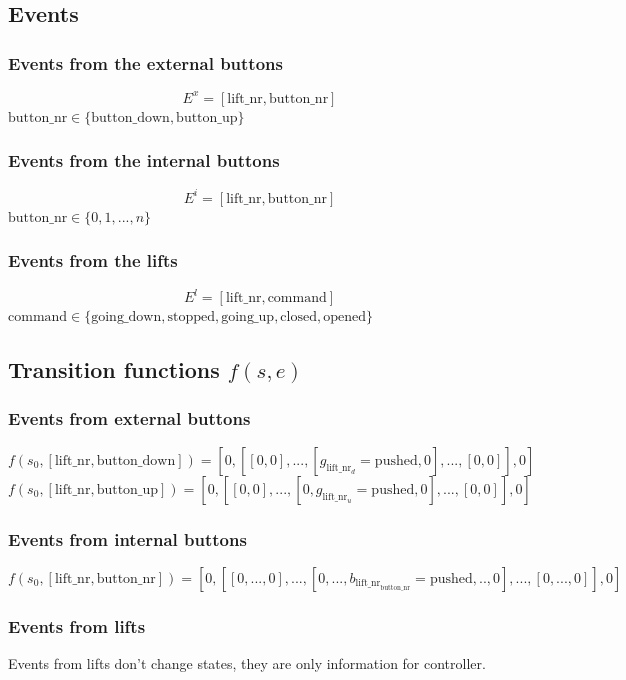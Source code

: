 \documentclass[12pt]{article}
\begin{document}
\subsection{Events}


\subsubsection{Events from the external buttons} 
\[ E^x = [\text{lift\_nr},\text{button\_nr}] \]
\(\text{button\_nr} \in \{\text{button\_down},\text{button\_up}\}\)

\subsubsection{Events from the internal buttons}
\[ E^i = [\text{lift\_nr},\text{button\_nr}] \]
\(\text{button\_nr} \in \{0, 1,..., n\}\)

\subsubsection{Events from the lifts}
\[ E^l = [\text{lift\_nr}, \text{command}] \]
\(\text{command} \in \{\text{going\_down},\text{stopped},\text{going\_up},\text{closed},\text{opened}\}\)

\subsection{Transition functions \(f(s,e)\)}

\subsubsection{Events from external buttons}
\[
  f(s_0,[\text{lift\_nr},\text{button\_down}]) =
  [0,[[0,0],...,[g_{\text{lift\_nr}_d}=\text{pushed},0],...,[0,0]],0]
\]
\[
  f(s_0,[\text{lift\_nr},\text{button\_up}]) =
  [0,[[0,0],...,[0,g_{\text{lift\_nr}_u}=\text{pushed},0],...,[0,0]],0]
\]


\subsubsection{Events from internal buttons}
\[
  f(s_0,[\text{lift\_nr},\text{button\_nr}]) =
  [0,[[0,...,0],...,[0,...,b_{\text{lift\_nr}_\text{button\_nr}}=\text{pushed},..,0],...,[0,...,0]],0]
\]

\subsubsection{Events from lifts}
Events from lifts don't change states, they are only information for controller.
\end{document}
